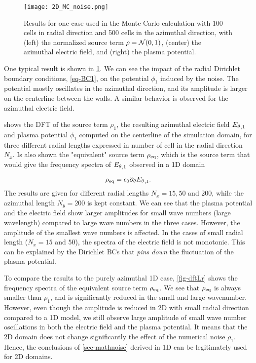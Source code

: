       \begin{figure}[hbt]
        \centering
        \texttt{[image: 2D\_MC\_noise.png]}
        \caption{Results for one case used in the Monte Carlo calculation with 100 cells in radial direction and 500 cells in the azimuthal direction, with (left) the normalized source term $\rho = \mathcal{N}(0, 1)$, (center) the azimuthal electric field, and (right) the plasma potential. }
        \label{fig-one}
      \end{figure}
      
      One typical result is shown in \cref{fig-one}.
      We can see the impact of the radial Dirichlet boundary conditions, \cref{eq-BC1}, on the potential $\phi_1$ induced by the noise.
      The potential mostly oscillates in the azimuthal direction, and its amplitude is larger on the centerline between the walls.
      A similar behavior is observed for the azimuthal electric field.      
      
       shows the \ac{DFT} of the source term $\rho_1$, the resulting azimuthal electric field ${E_{\theta}}_{, 1}$ and plasma potential $\phi_1$ computed on the centerline of the simulation domain, for three different radial lengths expressed in number of cell in the radial direction $N_x$.
      Is also shown the "equivalent" source term $\rho_{\rm eq}$, which is the source term that would give the frequency spectra of ${E_{\theta}}_{, 1}$ observed in a \ac{1D} domain
      
      \begin{equation} \label{eq-equirho}
        \rho_{\rm eq} = \epsilon_0 \partial_\theta {\ensuremath{E_{\theta}}}_{, 1}.
      \end{equation}
      The results are given for different radial lengths $N_x=15,50 \text{ and } 200$, while the azimuthal length $N_y=200$ is kept constant.
      We can see that the plasma potential and the electric field show larger amplitudes for small wave numbers (large wavelength) compared to large wave numbers in the three cases.
      However, the amplitude of the smallest wave numbers is affected.
      In the cases of small radial length ($N_x=15 \text{ and } 50$), the spectra of the electric field is not monotonic.
      This can be explained by the Dirichlet \ac{BC}s that {\it pins down} the fluctuation of the plasma potential.
      
      To compare the results to the purely azimuthal \ac{1D} case, \cref{fig-dftLr} shows the frequency spectra of the equivalent source term $\rho_{\rm eq}$.
      We see that $\rho_{\rm eq}$ is always smaller than $\rho_1$, and is significantly reduced in the small and large wavenumber.
      However, even though the amplitude is reduced in \ac{2D} with small radial direction compared to a \ac{1D} model, we still observe large amplitude of small wave number oscillations in both the electric field and the plasma potential.
      It means that the \ac{2D} domain does not change significantly the effect of the numerical noise $\rho_1$.
      Hence, the conclusions of  \cref{sec-mathnoise} derived in \ac{1D} can be legitimately used for \ac{2D} domains.
      
